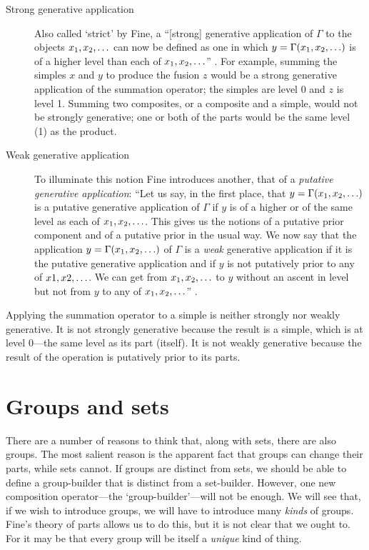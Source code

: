 \documentclass[11pt]{article}
\begin{document}
\begin{spacing}{1.5}
\begin{description}
  \item[Strong generative application] Also called `strict' by Fine, a
    ``[strong] generative application of $\Gamma$ to the objects $x_1,
    x_2, \mathellipsis$ can now be defined as one in which $y = \Gamma
    (x_1, x_2, \mathellipsis )$ is of a higher level than each of
    $x_1, x_2, \mathellipsis$'' \citeyearpar[584]{fine2010}.  For
    example, summing the simples $x$ and $y$ to produce the fusion $z$
    would be a strong generative application of the summation
    operator; the simples are level 0 and $z$ is level 1.  Summing two
    composites, or a composite and a simple, would not be strongly
    generative; one or both of the parts would be the same level (1)
    as the product.
  \item[Weak generative application] To illuminate this notion Fine
    introduces another, that of a {\em putative generative
      application}: ``Let us say, in the first place, that $y = \Gamma
    (x_1, x_2, \mathellipsis )$ is a putative generative application
    of $\Gamma$ if $y$ is of a higher or of the same level as each of
    $x_1, x_2, \mathellipsis$.  This gives us the notions of a
    putative prior component and of a putative prior in the usual way.
    We now say that the application $y = \Gamma (x_1, x_2,
    \mathellipsis )$ of $\Gamma$ is a {\em weak} generative
    application if it is the putative generative application and if
    $y$ is not putatively prior to any of $x1, x2, \mathellipsis$.  We
    can get from $x_1, x_2, \mathellipsis$ to $y$ without an ascent in
    level but not from $y$ to any of $x_1, x_2, \mathellipsis$''
    \citeyearpar[584]{fine2010}.
\end{description}

Applying the summation operator to a simple is neither strongly nor
weakly generative.  It is not strongly generative because the result
is a simple, which is at level 0---the same level as its part
(itself).  It is not weakly generative because the result of the
operation is putatively prior to its parts.

\section{Groups and sets}
\label{group}
There are a number of reasons to think that, along with sets, there
are also groups.  The most salient reason is the apparent fact that
groups can change their parts, while sets cannot.  If groups are
distinct from sets, we should be able to define a group-builder that
is distinct from a set-builder.  However, one new composition
operator---the `group-builder'---will not be enough.  We will see
that, if we wish to introduce groups, we will have to introduce many
{\em kinds} of groups.  Fine's theory of parts allows us to do this,
but it is not clear that we ought to.  For it may be that every group
will be itself a {\em unique} kind of thing.


\end{spacing}
\end{document}
